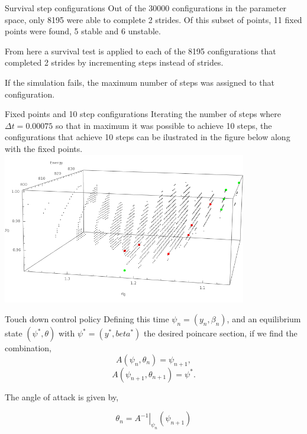 \documentclass{beamer}
\begin{document}
\begin{frame}{Survival step configurations}
  Out of the 30000 configurations in the parameter space, only 8195 were able to complete 2 strides. Of this subset of points, 11 fixed points were found, 5 stable and 6 unstable.
  \vspace{0.25 cm}
  
  From here a survival test is applied to each of the 8195 configurations that completed 2 strides by incrementing steps instead of strides.
  \vspace{0.25 cm}
  
  If the simulation fails, the maximum number of steps was assigned to that configuration.
\end{frame}

\begin{frame}{Fixed points and 10 step configurations}
  Iterating the number of steps where $\Delta t=0.00075$ so that in maximum it was possible to achieve 10 steps, the configurations that achieve 10 steps can be ilustrated in the figure below along with the fixed points.
  \includegraphics[width=0.8\textwidth]{newfixedpoints.png}


\end{frame}

\begin{frame}{Touch down control policy}
  Defining this time $\psi_n=(y_n,\beta_n)$, and an equilibrium state $(\psi^*,\theta)$ with $\psi^*=(y^*,beta^*)$ the desired poincare section, if we find the combination, 
  \begin{equation}  
  A(\psi_n,\theta_n)=\psi_{n+1},
  \label{eq.psi1}
  \end{equation}
\begin{equation}
  A(\psi_{n+1},\theta_{n+1})=\psi^*.
  \label{eq.psi+1}
\end{equation}


\vspace{0.5 cm}


 \begin{flushleft} 
   The angle of attack is given by,
   \end{flushleft}
\begin{equation}
  \theta_n=\left.A^{-1}\right|_{\psi_n}(\psi_{n+1})
\end{equation}
\end{frame}
\end{document}
